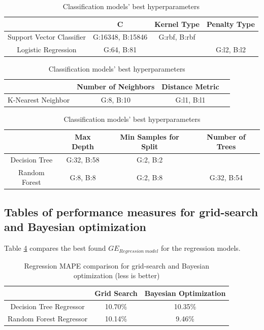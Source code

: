 \documentclass[12pt, letterpaper]{article}
\begin{document}
\begin{table}[H]
\centering
\caption{Classification models' best hyperparameters}
\label{cls_table 1}
\begin{tabular}{c|c|c|c} %
                            & C         & Kernel Type   & Penalty Type \\ \hline
Support Vector Classifier   & G:16348, B:15846     & G:rbf, B:rbf \\
Logistic Regression         & G:64, B:81        &               & G:l2, B:l2 \\
\end{tabular}
\end{table}

\begin{table}[H]
\centering
\caption{Classification models' best hyperparameters}
\label{cls_table 2}
\begin{tabular}{c|c|c|c} %
                & Number of Neighbors & Distance Metric\\ \hline
K-Nearest Neighbor & G:8, B:10 & G:l1, B:l1 \\
\end{tabular}
\end{table}

\begin{table}[H]
\centering
\caption{Classification models' best hyperparameters}
\label{cls_table 3}
\begin{tabular}{c|c|c|c} %
                & Max Depth     & Min Samples for Split     & Number of Trees \\ \hline
Decision Tree   & G:32, B:58 & G:2, B:2 \\
Random Forest   & G:8, B:8 & G:2, B:8 & G:32, B:54 \\
\end{tabular}
\end{table}

\subsection{Tables of performance measures for grid-search and Bayesian optimization}

Table \ref{perf_measures_reg} compares the best found $GE_{Regression\ model}$ for the regression models.

\begin{table}[H]
\centering
\caption{Regression MAPE comparison for grid-search and Bayesian optimization (less is better)}
\label{perf_measures_reg}
\begin{tabular}{c|c|c} %
                            & Grid Search     & Bayesian Optimization  \\ \hline
Decision Tree Regressor     & 10.70\% & 10.35\% \\
Random Forest Regressor     & 10.14\% & 9.46\%\\
\end{tabular}
\end{table}
\end{document}
